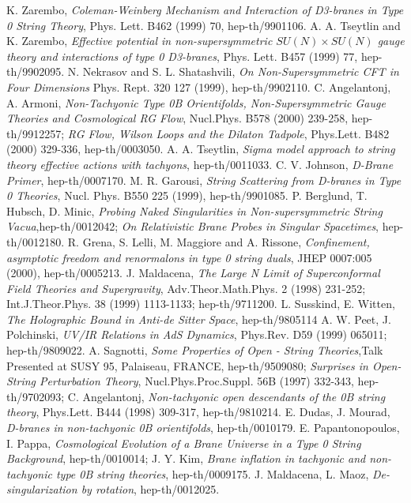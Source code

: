 \documentclass[a4paper,12pt]{article}
\begin{document}
\begin{thebibliography}{99}
 K. Zarembo, {\it Coleman-Weinberg Mechanism and Interaction of D3-branes in Type 0 String Theory}, Phys. Lett. B462 (1999) 70, hep-th/9901106. 
 A. A. Tseytlin and K. Zarembo, {\it Effective potential in non-supersymmetric $SU(N)\times SU(N)$ gauge theory and interactions of type 0 D3-branes}, Phys. Lett. B457 (1999) 77, hep-th/9902095.
 N. Nekrasov and S. L. Shatashvili, {\it On Non-Supersymmetric CFT in Four Dimensions} Phys. Rept. 320 127 (1999), hep-th/9902110.  
C. Angelantonj, A. Armoni, {\it Non-Tachyonic Type 0B Orientifolds, Non-Supersymmetric Gauge Theories and Cosmological RG Flow}, Nucl.Phys. B578 (2000) 239-258, hep-th/9912257; {\it RG Flow, Wilson Loops and the Dilaton Tadpole}, Phys.Lett. B482 (2000) 329-336, hep-th/0003050.
 A. A. Tseytlin, {\it Sigma model approach to string theory effective actions with tachyons}, hep-th/0011033.
 C. V. Johnson, {\it D-Brane Primer}, hep-th/0007170.
 M. R. Garousi, {\it String Scattering from D-branes in Type 0 Theories}, 
Nucl. Phys. B550 225 (1999), hep-th/9901085.
 P. Berglund, T. Hubsch, D. Minic, {\it Probing Naked Singularities in Non-supersymmetric String Vacua},hep-th/0012042; {\it On Relativistic Brane Probes in Singular Spacetimes}, hep-th/0012180.
 R. Grena, S. Lelli, M. Maggiore and A. Rissone, {\it Confinement, asymptotic freedom and renormalons in type 0 string duals}, JHEP 0007:005 (2000), hep-th/0005213.
J. Maldacena, {\it The Large N Limit of Superconformal Field Theories and Supergravity},
Adv.Theor.Math.Phys. 2 (1998) 231-252; Int.J.Theor.Phys. 38 (1999) 1113-1133; 
hep-th/9711200. 
L. Susskind, E. Witten, {\it The Holographic Bound in Anti-de Sitter Space},
hep-th/9805114 
 A. W. Peet, J. Polchinski, {\it UV/IR Relations in AdS Dynamics},
Phys.Rev. D59 (1999) 065011; hep-th/9809022.
A. Sagnotti, {\it Some Properties of Open - String Theories},Talk Presented at SUSY 95, Palaiseau, FRANCE, hep-th/9509080; {\it Surprises in Open-String Perturbation Theory}, Nucl.Phys.Proc.Suppl. 56B (1997) 332-343, hep-th/9702093; C. Angelantonj, {\it  Non-tachyonic open descendants of the 0B string theory}, Phys.Lett. B444 (1998) 309-317, hep-th/9810214. 
 E. Dudas, J. Mourad, {\it D-branes in non-tachyonic 0B orientifolds}, hep-th/0010179.
 E. Papantonopoulos, I. Pappa, {\it Cosmological Evolution of a Brane Universe in a Type 0 String Background}, hep-th/0010014; J. Y. Kim, {\it Brane inflation in tachyonic and non-tachyonic type 0B string theories}, hep-th/0009175.
 J. Maldacena, L. Maoz, {\it De-singularization by rotation}, hep-th/0012025.








\end{thebibliography}
\end{document}
